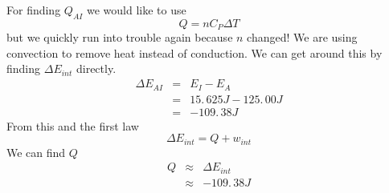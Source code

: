 \documentclass{article}
\begin{document}
For finding $Q_{AI}$ we would like to use 
\[
Q=nC_{P}\Delta T
\]%
but we quickly run into trouble again because $n$ changed! We are using
convection to remove heat instead of conduction. We can get around this by
finding $\Delta E_{int}$ directly. 
\begin{eqnarray*}
\Delta E_{AI} &=&E_{I}-E_{A} \\
&=&15.\,\allowbreak 625\unit{J}-125.\,\allowbreak 00\unit{J} \\
&=&-109.\,\allowbreak 38\unit{J}
\end{eqnarray*}%
From this and the first law%
\[
\Delta E_{int}=Q+w_{int}
\]%
We can find $Q$%
\begin{eqnarray*}
Q &\approx &\Delta E_{int} \\
&\approx &-109.\,\allowbreak 38\unit{J}
\end{eqnarray*}
\end{document}
